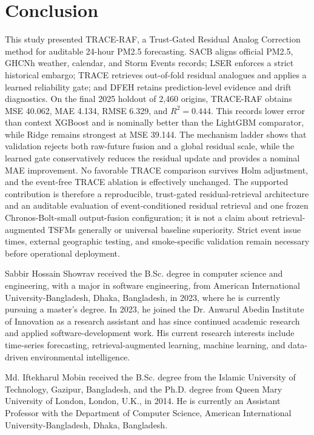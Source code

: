 \documentclass{ieeeaccess}
\begin{document}
\section{Conclusion}

This study presented TRACE-RAF, a Trust-Gated Residual Analog Correction method
for auditable 24-hour PM2.5 forecasting. SACB aligns official PM2.5, GHCNh
weather, calendar, and Storm Events records; LSER enforces a strict historical
embargo; TRACE retrieves out-of-fold residual analogues and applies a learned
reliability gate; and DFEH retains prediction-level evidence and drift
diagnostics. On the final 2025 holdout of 2,460 origins, TRACE-RAF obtains MSE
40.062, MAE 4.134, RMSE 6.329, and $R^2=0.444$. This records lower error than context XGBoost
and is nominally better than the LightGBM comparator, while Ridge remains strongest at
MSE 39.144. The mechanism ladder shows that validation rejects both raw-future
fusion and a global residual scale, while the learned gate conservatively
reduces the residual update and provides a nominal MAE improvement. No
favorable TRACE comparison survives Holm adjustment, and the event-free TRACE
ablation is effectively unchanged. The supported contribution is therefore a
reproducible, trust-gated residual-retrieval architecture and an auditable
evaluation of event-conditioned residual retrieval and one frozen
Chronos-Bolt-small output-fusion configuration; it is not a claim about
retrieval-augmented TSFMs generally or universal baseline superiority. Strict event issue times,
external geographic testing, and smoke-specific validation remain necessary
before operational deployment.




\begin{IEEEbiographynophoto}{Sabbir Hossain Showrav}
received the B.Sc. degree in computer science and engineering, with a major in
software engineering, from American International University-Bangladesh,
Dhaka, Bangladesh, in 2023, where he is currently pursuing a master's degree.
In 2023, he joined the Dr. Anwarul Abedin Institute of Innovation as a research
assistant and has since continued academic research and applied
software-development work. His current research interests include time-series forecasting,
retrieval-augmented learning, machine learning, and data-driven environmental
intelligence.
\end{IEEEbiographynophoto}

\begin{IEEEbiographynophoto}{Md. Iftekharul Mobin}
received the B.Sc. degree from the Islamic University of Technology, Gazipur,
Bangladesh, and the Ph.D. degree from Queen Mary University of London, London,
U.K., in 2014. He is currently an Assistant Professor with the Department of
Computer Science, American International University-Bangladesh, Dhaka,
Bangladesh.
\end{IEEEbiographynophoto}
\end{document}

